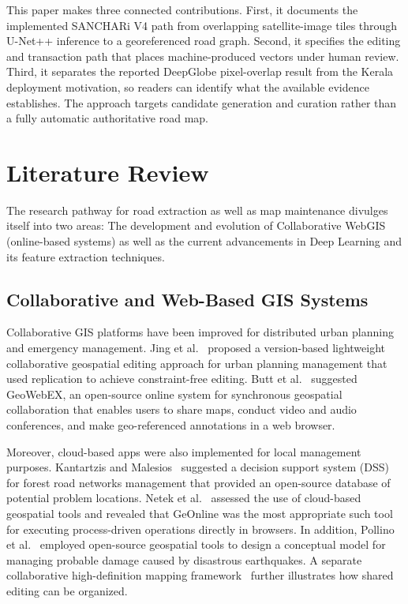 \documentclass[10pt,a4paper,twocolumn]{article}
\begin{document}
This paper makes three connected contributions. First, it documents the implemented SANCHARi V4 path from overlapping satellite-image tiles through U-Net++ inference to a georeferenced road graph. Second, it specifies the editing and transaction path that places machine-produced vectors under human review. Third, it separates the reported DeepGlobe pixel-overlap result from the Kerala deployment motivation, so readers can identify what the available evidence establishes. The approach targets candidate generation and curation rather than a fully automatic authoritative road map.


\section{Literature Review}
The research pathway for road extraction as well as map maintenance divulges itself into two areas: The development and evolution of Collaborative WebGIS (online-based systems) as well as the current advancements in Deep Learning and its feature extraction techniques.

\subsection{Collaborative and Web-Based GIS Systems}
Collaborative GIS platforms have been improved for distributed urban planning and emergency management. Jing et al.~\cite{b1} proposed a version-based lightweight collaborative geospatial editing approach for urban planning management that used replication to achieve constraint-free editing. Butt et al.~\cite{b2} suggested GeoWebEX, an open-source online system for synchronous geospatial collaboration that enables users to share maps, conduct video and audio conferences, and make geo-referenced annotations in a web browser.

Moreover, cloud-based apps were also implemented for local management purposes. Kantartzis and Malesios~\cite{b3} suggested a decision support system (DSS) for forest road networks management that provided an open-source database of potential problem locations. Netek et al.~\cite{b4} assessed the use of cloud-based geospatial tools and revealed that GeOnline was the most appropriate such tool for executing process-driven operations directly in browsers. In addition, Pollino et al.~\cite{b5} employed open-source geospatial tools to design a conceptual model for managing probable damage caused by disastrous earthquakes. A separate collaborative high-definition mapping framework~\cite{b7} further illustrates how shared editing can be organized.
\end{document}
